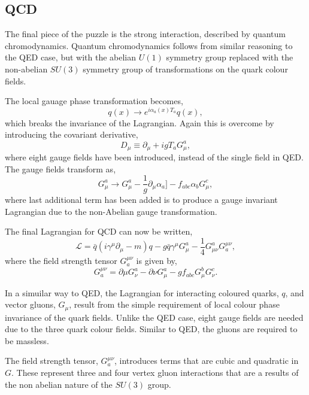 \subsection{QCD}
The final piece of the puzzle is the strong interaction, described by quantum
chromodynamics. 
Quantum chromodynamics follows from similar reasoning to the QED case, but with
the abelian $U(1)$ symmetry group replaced with the non-abelian $SU(3)$ symmetry
group of transformations on the quark colour fields.

The local gauage phase transformation becomes,
\begin{equation}
q(x) \to e^{i\alpha_a(x)T_a} q(x),
\end{equation}
which breaks the invariance of the Lagrangian. Again this is overcome by
introducing the covariant derivative,
\begin{equation}
D_{\mu} \equiv \partial_{\mu} + i g T_{a} G_{\mu}^{a},
\end{equation}
where eight gauge fields have been introduced, instead of the single field in
QED.   The gauge fields transform as,
\begin{equation}
 G_{\mu}^{a} \to G_{\mu}^{a} 
-\frac{1}{g}\partial_{\mu}\alpha_{a}]
-f_{abc}\alpha_{b}G^{c}_{\mu},
\end{equation}
where last additional term has been added is to produce a gauge invariant
Lagrangian due to the non-Abelian gauge transformation.

The final Lagrangian for QCD can now be written,
\begin{equation}
\mathcal{L} = 
\bar{q}(i\gamma^{\mu}\partial_{\mu} - m)q -
g \bar{q} \gamma^{\mu} G_{\mu}^{a} - 
\frac{1}{4} G_{\mu\nu}^{a} G^{\mu\nu}_{a},
\end{equation}
where the field strength tensor $G^{\mu\nu}_{a}$ is given by,
\begin{equation}
G^{\mu\nu}_{a} 
= \partial{\mu} G^{a}_{\nu}
- \partial{\nu} G^{a}_{\mu}
-g f_{abc} G^{b}_{\mu} G^{c}_{\nu}.
\end{equation}

In a simuilar way to QED, the Lagrangian for interacting coloured quarks, $q$, and
vector gluons, $G_{\mu}$, result from the simple requirement of local colour
phase invariance of the quark fields. Unlike the QED case, eight gauge fields
are needed due to the three quark colour fields.  Similar to QED, the gluons are
required to  be massless.

The field strength tensor, $G^{\mu\nu}_{a}$, introduces terms that are cubic and
quadratic in $G$. These represent three and four vertex gluon interactions that
are a results of the non abelian nature of the $SU(3)$ group.

